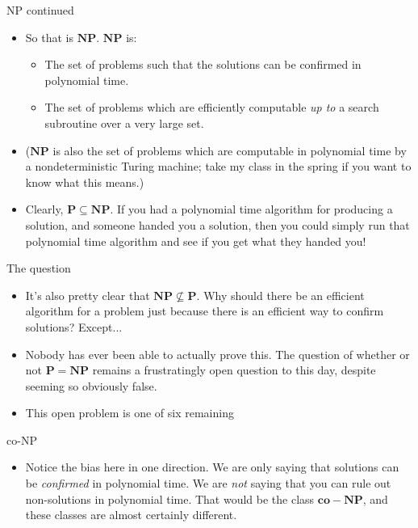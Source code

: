 \documentclass{beamer}
\begin{document}
\begin{frame}{NP continued}
    \begin{itemize}
        \item So that is $\mathbf{NP}$. $\mathbf{NP}$ is:
        \begin{itemize}
            \item The set of problems such that the solutions can be confirmed in polynomial time.
            \item The set of problems which are efficiently computable \emph{up to} a search subroutine over a very large set.
        \end{itemize}
        \item ($\mathbf{NP}$ is also the set of problems which are computable in polynomial time by a nondeterministic Turing machine; take my class in the spring if you want to know what this means.) 
        \item Clearly, $\mathbf{P} \subseteq \mathbf{NP}$. If you had a polynomial time algorithm for producing a solution, and someone handed you a solution, then you could simply run that polynomial time algorithm and see if you get what they handed you!
    \end{itemize}
\end{frame}

\begin{frame}{The question}
    \begin{itemize}
        \item It's also pretty clear that $\mathbf{NP} \nsubseteq \mathbf{P}$. Why should there be an efficient algorithm for a problem just because there is an efficient way to confirm solutions? Except...
        \item Nobody has ever been able to actually prove this. The question of whether or not $\mathbf{P} = \mathbf{NP}$ remains a frustratingly open question to this day, despite seeming so obviously false. \pause 
        \item This open problem is one of six remaining
    \end{itemize}
\end{frame}

\begin{frame}{co-NP}
    \begin{itemize}
        \item Notice the bias here in one direction. We are only saying that solutions can be \emph{confirmed} in polynomial time. We are \emph{not} saying that you can rule out non-solutions in polynomial time. That would be the class $\mathbf{co-NP}$, and these classes are almost certainly different. 
    \end{itemize}

\end{frame}
\end{document}
